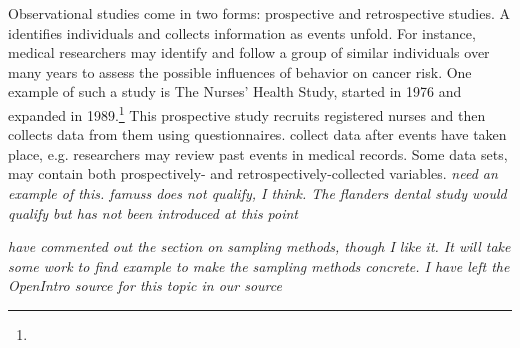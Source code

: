 \begin{doublespace}
Observational studies come in two forms: prospective and retrospective studies. A  identifies individuals and collects information as events unfold. For instance, medical researchers may identify and follow a group of similar individuals over many years to assess the possible influences of behavior on cancer risk. One example of such a study is The Nurses' Health Study, started in 1976 and expanded in 1989.\footnote{} This prospective study recruits registered nurses and then collects data from them using questionnaires.  collect data after events have taken place, e.g. researchers may review past events in medical records. Some data sets, may contain both prospectively- and retrospectively-collected variables. \textit{need an example of this.  famuss does not qualify, I think.  The flanders dental study would qualify but has not been introduced at this point}

\textit{have commented out the section on sampling methods, though I like it.  It will take some work to find example to make the sampling methods concrete. I have left the OpenIntro source for this topic in our source}

\end{doublespace}
